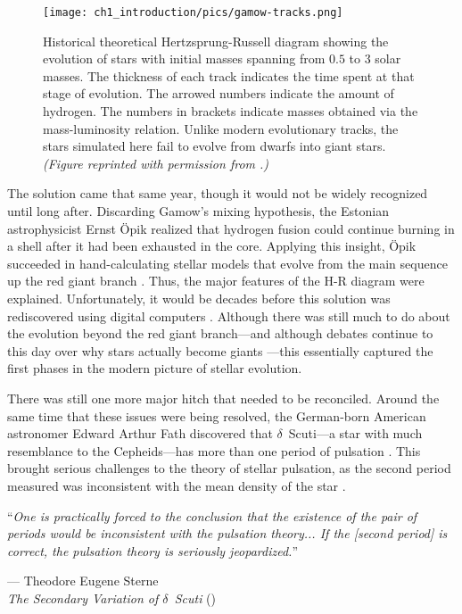 \begin{figure}
    \centering
    \texttt{[image: ch1\_introduction/pics/gamow-tracks.png]}
    \caption[Historical theoretical H-R diagram]{
        Historical theoretical Hertzsprung-Russell diagram showing the evolution of stars with initial masses spanning from $0.5$ to $3$ solar masses. 
        The thickness of each track indicates the time spent at that stage of evolution. 
        The arrowed numbers indicate the amount of hydrogen. 
        The numbers in brackets indicate masses obtained via the mass-luminosity relation. 
        Unlike modern evolutionary tracks, the stars simulated here fail to evolve from dwarfs into giant stars. 
        \emph{(Figure reprinted with permission from \citealt{1938PhRv...53..907G}.)}
    \label{fig:gamow-tracks}}
\end{figure}

The solution came that same year, though it would not be widely recognized until long after. 
Discarding Gamow's mixing hypothesis, the Estonian astrophysicist Ernst \"Opik realized that hydrogen fusion could continue burning in a shell after it had been exhausted in the core. 
Applying this insight, \"Opik succeeded in hand-calculating stellar models that evolve from the main sequence up the red giant branch \citep{1938PTarO..30C...1O}. 
Thus, the major features of the H-R diagram were explained. 
Unfortunately, it would be decades before this solution was rediscovered using digital computers \citep[e.g.,][]{ARNY1990211}. 
Although there was still much to do about the evolution beyond the red giant branch---and although debates continue to this day over why stars actually become giants \citep[e.g.,][etc.]{10.1007/978-94-009-8492-9_18,1992ApJ...400..280R,1983A&A...127..411W,1985ApJ...296..554Y,1988ApJ...329..803A,1989MNRAS.236..505W,1991AnPh...16..515W,2000ApJ...538..837S}---this essentially captured the first phases in the modern picture of stellar evolution. 






There was still one more major hitch that needed to be reconciled. 
Around the same time that these issues were being resolved, the German-born American astronomer Edward Arthur Fath discovered that $\delta$~Scuti---a star with much resemblance to the Cepheids---has more than one period of pulsation \citep{fath1935photometric}. 
This brought serious challenges to the theory of stellar pulsation, as the second period measured was inconsistent with the mean density of the star \citep{1938ApJ....87..133S,1940PNAS...26..537S}. 
\epigraph{``\emph{One is practically forced to the conclusion that the existence of the pair of periods \hphantom{``}would be inconsistent with the pulsation theory... If the [second period] is correct, \hphantom{``}the pulsation theory is seriously jeopardized.}''}{--- Theodore Eugene Sterne\\\textit{The Secondary Variation of $\delta$~Scuti} (\citeyear{1938ApJ....87..133S})}


